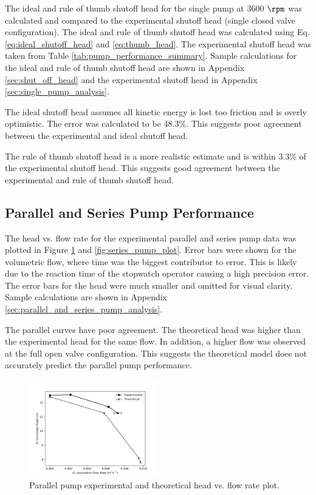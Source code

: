\noindent The ideal and rule of thumb shutoff head for the single pump at 3600 $\unit{\rpm}$ was calculated and compared to the experimental shutoff head (single closed valve configuration). The ideal and rule of thumb shutoff head was calculated using Eq. \ref{eq:ideal_shutoff_head} and \ref{eq:thumb_head}. The experimental shutoff head was taken from Table \ref{tab:pump_performance_summary}. Sample calculations for the ideal and rule of thumb shutoff head are shown in Appendix \ref{sec:shut_off_head} and the experimental shutoff head in Appendix \ref{sec:single_pump_analysis}.

The ideal shutoff head assumes all kinetic energy is lost too friction and is overly optimistic. The error was calculated to be 48.3\%. This suggests poor agreement between the experimental and ideal shutoff head.

The rule of thumb shutoff head is a more realistic estimate and is within 3.3\% of the experimental shutoff head. This suggests good agreement between the experimental and rule of thumb shutoff head.

\subsection{Parallel and Series Pump Performance}
The head vs. flow rate for the experimental parallel and series pump data was plotted in Figure \ref{fig:parallel_pump_plot} and \ref{fig:series_pump_plot}.
Error bars were shown for the volumetric flow, where time was the biggest contributor to error. This is likely due to the reaction time of the stopwatch operator causing a high precision error. The error bars for the head were much smaller and omitted for visual clarity. Sample calculations are shown in Appendix \ref{sec:parallel_and_series_pump_analysis}.

The parallel curves have poor agreement. The theoretical head was higher than the experimental head for the same flow. In addition, a higher flow was observed at the full open valve configuration. This suggests the theoretical model does not accurately predict the parallel pump performance.
\begin{figure}[H]
    \centering
    \includegraphics[width=0.5\textwidth]{Sections/Figures/Parallel Pump Plot.png}
    \caption{Parallel pump experimental and theoretical head vs. flow rate plot.}
    \label{fig:parallel_pump_plot}
\end{figure}

